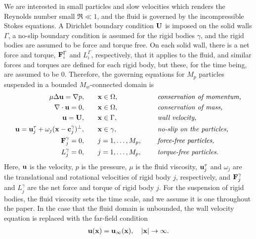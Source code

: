 \documentclass[preprint, 10pt]{elsarticle}
\begin{document}
We are interested in small particles and slow velocities which renders
the Reynolds number small $\Re \ll 1$, and the fluid is governed by the
incompressible Stokes equations.  A Dirichlet boundary condition ${\mathbf{U}}$
is imposed on the solid walls $\Gamma$, a no-slip boundary condition is
assumed for the rigid bodies $\gamma$, and the rigid bodies are assumed
to be force and torque free.  On each solid wall, there is a net force
and torque, ${\mathbf{F}}^\Gamma_i$ and $L^\Gamma_i$, respectively, that it
applies to the fluid, and similar forces and torques are defined for
each rigid body, but these, for the time being, are assumed to be 0.
Therefore, the governing equations for $M_p$ particles suspended in a
bounded $M_w$-connected domain is
\begin{equation}
  \label{eqn:modelEquations}
  \begin{split}
  \mu \Delta {\mathbf{u}} = {\nabla} p, &\hspace{20pt} {\mathbf{x}} \in \Omega, \hspace*{.2in}
    &&\mbox{\em conservation of momentum,}\\
  {\nabla} \cdot {\mathbf{u}} = 0, &\hspace{20pt} {\mathbf{x}} \in \Omega, \hspace*{.2in}
    &&\mbox{\em conservation of mass,} \\
  {\mathbf{u}} = {\mathbf{U}}, &\hspace{20pt} {\mathbf{x}} \in \Gamma, \hspace*{.2in} 
    &&\mbox{\em wall velocity,} \\
  {\mathbf{u}} = {\mathbf{u}}^\tau_j + \omega_j({\mathbf{x}}-{\mathbf{c}}^\gamma_j)^\perp,&\hspace{20pt} 
    {\mathbf{x}} \in \gamma, \hspace*{.2in} &&\mbox{\em no-slip on the particles,} \\
  {\mathbf{F}}_j^\gamma = 0, &\hspace{20pt}j=1,\ldots,M_p, \hspace*{.2in} 
    &&\mbox{\em force-free particles,} \\
  L_j^\gamma = 0, &\hspace{20pt}j=1,\ldots,M_p, \hspace*{.2in} 
    &&\mbox{\em torque-free particles.}
  \end{split}
\end{equation}
Here, ${\mathbf{u}}$ is the velocity, $p$ is the pressure, $\mu$ is the fluid
viscosity, ${\mathbf{u}}^\tau_j$ and $\omega_j$ are the translational and
rotational velocities of rigid body $j$, respectively, and
${\mathbf{F}}_j^\gamma$ and $L_j^\gamma$ are the net force and torque of rigid
body $j$.  For the suspension of rigid bodies, the fluid viscosity sets
the time scale, and we assume it is one throughout the paper.  In the
case that the fluid domain is unbounded, the wall velocity equation is
replaced with the far-field condition
\begin{align*}
  {\mathbf{u}}({\mathbf{x}}) = {\mathbf{u}}_\infty({\mathbf{x}}), \quad |{\mathbf{x}}| \rightarrow \infty.
\end{align*}
\end{document}
